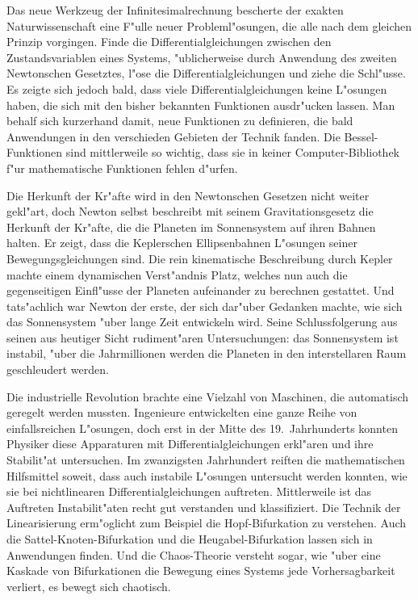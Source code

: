Das neue Werkzeug der Infinitesimalrechnung bescherte der exakten
Naturwissenschaft eine F"ulle neuer Probleml"osungen, die alle
nach dem gleichen Prinzip vorgingen.
Finde die Differentialgleichungen zwischen den Zustandsvariablen
eines Systems, "ublicherweise durch Anwendung des zweiten
Newtonschen Gesetztes, l"ose die Differentialgleichungen und
ziehe die Schl"usse.
Es zeigte sich jedoch bald, dass viele Differentialgleichungen
keine L"osungen haben, die sich mit den bisher bekannten Funktionen
ausdr"ucken lassen.
Man behalf sich kurzerhand damit, neue Funktionen zu definieren, 
die bald Anwendungen in den verschieden Gebieten der Technik fanden.
Die Bessel-Funktionen sind mittlerweile so wichtig, dass sie in keiner
Computer-Bibliothek f"ur mathematische Funktionen fehlen d"urfen.

Die Herkunft der Kr"afte wird in den Newtonschen Gesetzen nicht weiter
gekl"art, doch Newton selbst beschreibt mit seinem Gravitationsgesetz
die Herkunft der Kr"afte, die die Planeten im Sonnensystem auf ihren Bahnen
halten.
Er zeigt, dass die Keplerschen Ellipsenbahnen L"osungen seiner
Bewegungsgleichungen sind.
Die rein kinematische Beschreibung durch Kepler machte einem
dynamischen Verst"andnis Platz, welches nun auch die gegenseitigen
Einfl"usse der Planeten aufeinander zu berechnen gestattet.
Und tats"achlich war Newton der erste, der sich dar"uber Gedanken
machte, wie sich das Sonnensystem "uber lange Zeit entwickeln wird.
Seine Schlussfolgerung aus seinen aus heutiger Sicht rudiment"aren
Untersuchungen: das Sonnensystem ist instabil, "uber die Jahrmillionen 
werden die Planeten in den interstellaren Raum geschleudert werden.

Die industrielle Revolution brachte eine Vielzahl von Maschinen,
die automatisch geregelt werden mussten.
Ingenieure entwickelten eine ganze Reihe von einfallsreichen L"osungen,
doch erst in der Mitte des 19.~Jahrhunderts konnten Physiker diese
Apparaturen mit Differentialgleichungen erkl"aren und ihre Stabilit"at
untersuchen.
Im zwanzigsten Jahrhundert reiften die mathematischen Hilfsmittel
soweit, dass auch instabile L"osungen untersucht werden konnten,
wie sie bei nichtlinearen Differentialgleichungen auftreten.
Mittlerweile ist das Auftreten Instabilit"aten recht gut verstanden
und klassifiziert. 
Die Technik der Linearisierung erm"oglicht zum Beispiel die
Hopf-Bifurkation zu verstehen.
Auch die Sattel-Knoten-Bifurkation und die Heugabel-Bifurkation
lassen sich in Anwendungen finden.
Und die Chaos-Theorie versteht sogar, wie "uber eine Kaskade von
Bifurkationen die Bewegung eines Systems jede Vorhersagbarkeit verliert,
es bewegt sich chaotisch.

